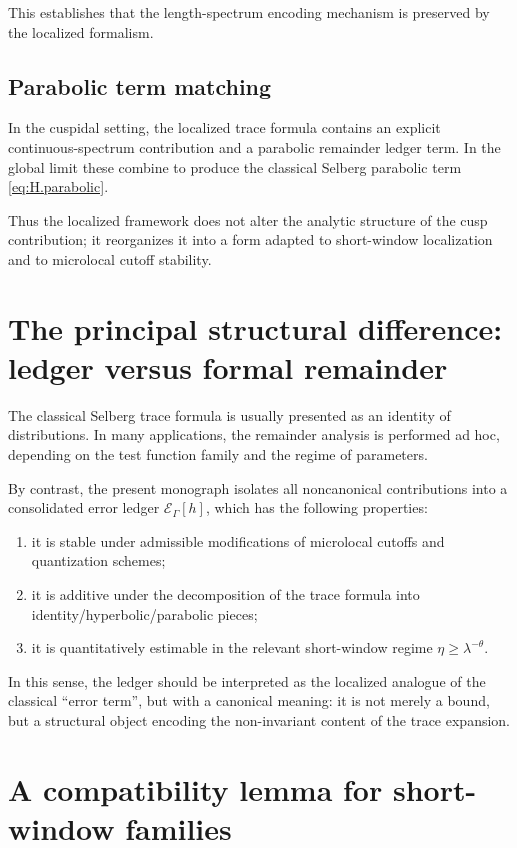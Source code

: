 This establishes that the length-spectrum encoding mechanism is preserved by the localized formalism.

\subsection{Parabolic term matching}
\label{subsec:H.parabolic.match}

In the cuspidal setting, the localized trace formula contains an explicit continuous-spectrum contribution and a
parabolic remainder ledger term.  In the global limit these combine to produce the classical Selberg parabolic term
\eqref{eq:H.parabolic}.

Thus the localized framework does not alter the analytic structure of the cusp contribution; it reorganizes it into a
form adapted to short-window localization and to microlocal cutoff stability.

\section{The principal structural difference: ledger versus formal remainder}
\label{sec:H.ledger.diff}

The classical Selberg trace formula is usually presented as an identity of distributions.
In many applications, the remainder analysis is performed ad hoc, depending on the test function family and the
regime of parameters.

By contrast, the present monograph isolates all noncanonical contributions into a consolidated error ledger
$\mathcal{E}_\Gamma[h]$, which has the following properties:

\begin{enumerate}
\item it is stable under admissible modifications of microlocal cutoffs and quantization schemes;
\item it is additive under the decomposition of the trace formula into identity/hyperbolic/parabolic pieces;
\item it is quantitatively estimable in the relevant short-window regime $\eta\ge \lambda^{-\theta}$.
\end{enumerate}

In this sense, the ledger should be interpreted as the localized analogue of the classical ``error term'', but with a
canonical meaning: it is not merely a bound, but a structural object encoding the non-invariant content of the trace
expansion.

\section{A compatibility lemma for short-window families}
\label{sec:H.compatibility.short}

